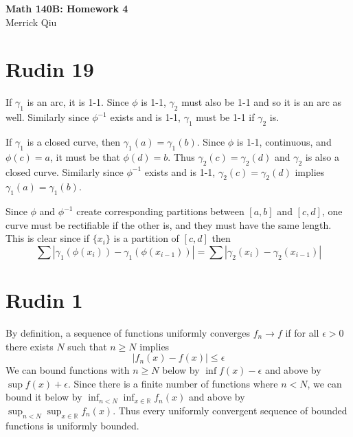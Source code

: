 \documentclass{article}
\begin{document}
\begin{center}
	\huge{\bf Math 140B: Homework 4} \\
	Merrick Qiu
\end{center}

\section*{Rudin 19}
If $\gamma_1$ is an arc, it is 1-1.
Since $\phi$ is 1-1, $\gamma_2$ must also be 1-1
and so it is an arc as well.
Similarly since $\phi^{-1}$ exists and is 1-1,
$\gamma_1$ must be 1-1 if $\gamma_2$ is.

If $\gamma_1$ is a closed curve, then $\gamma_1(a) = \gamma_1(b)$.
Since $\phi$ is 1-1, continuous, and $\phi(c) = a$, it must be that $\phi(d) = b$.
Thus $\gamma_2(c) = \gamma_2(d)$ and $\gamma_2$ is also a closed curve.
Similarly since $\phi^{-1}$ exists and is 1-1,
$\gamma_2(c) = \gamma_2(d)$ implies $\gamma_1(a) = \gamma_1(b)$.

Since $\phi$ and $\phi^{-1}$ create corresponding partitions between
$[a,b]$ and $[c,d]$, one curve must be rectifiable if the other is,
and they must have the same length.
This is clear since if $\{x_i\}$ is a partition of $[c,d]$ then
\[
	\sum |\gamma_1(\phi(x_i)) - \gamma_1(\phi(x_{i-1}))| = \sum |\gamma_2(x_i) - \gamma_2(x_{i-1})|
\]
\newpage 

\section*{Rudin 1}
By definition, a sequence of functions uniformly converges $f_n \to f$
if for all $\epsilon > 0$ there exists $N$ such that $n \geq N$ implies 
\[
	|f_n(x) - f(x)| \leq \epsilon
\]
We can bound functions with $n \geq N$ below by $\inf f(x) - \epsilon$
and above by $\sup f(x) + \epsilon$.
Since there is a finite number of functions where $n < N$,
we can bound it below by $\inf_{n < N} \inf_{x \in \mathbb{R}} f_n(x)$
and above by $\sup_{n < N} \sup_{x \in \mathbb{R}} f_n(x)$.
Thus every uniformly convergent sequence of bounded functions is uniformly bounded.
\newpage 
\end{document}
